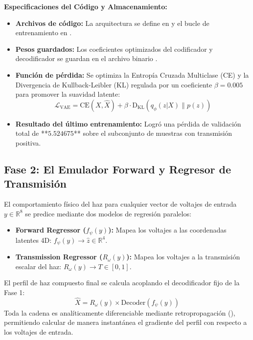 \documentclass[12pt,letterpaper]{article}
\begin{document}
\textbf{Especificaciones del Código y Almacenamiento:}
\begin{itemize}
    \item \textbf{Archivos de código:} La arquitectura se define en  y el bucle de entrenamiento en .
    \item \textbf{Pesos guardados:} Los coeficientes optimizados del codificador y decodificador se guardan en el archivo binario .
    \item \textbf{Función de pérdida:} Se optimiza la Entropía Cruzada Multiclase (CE) y la Divergencia de Kullback-Leibler (KL) regulada por un coeficiente $\beta = 0.005$ para promover la suavidad latente:
    \begin{equation}
        \mathcal{L}_{\text{VAE}} = \text{CE}(X, \hat{X}) + \beta \cdot \text{D}_{\text{KL}}(q_\phi(z|X) \parallel p(z))
    \end{equation}
    \item \textbf{Resultado del último entrenamiento:} Logró una pérdida de validación total de **$5.524675$** sobre el subconjunto de muestras con transmisión positiva.
\end{itemize}

\subsection{Fase 2: El Emulador Forward y Regresor de Transmisión}
El comportamiento físico del haz para cualquier vector de voltajes de entrada $y \in \mathbb{R}^8$ se predice mediante dos modelos de regresión paralelos:
\begin{itemize}
    \item \textbf{Forward Regressor ($f_\psi(y)$):} Mapea los voltajes a las coordenadas latentes 4D: $f_\psi(y) \to \hat{z} \in \mathbb{R}^4$.
    \item \textbf{Transmission Regressor ($R_\omega(y)$):} Mapea los voltajes a la transmisión escalar del haz: $R_\omega(y) \to T \in [0, 1]$.
\end{itemize}
El perfil de haz compuesto final se calcula acoplando el decodificador fijo de la Fase 1:
\begin{equation}
    \hat{X} = R_\omega(y) \times \text{Decoder}(f_\psi(y))
\end{equation}
Toda la cadena es analíticamente diferenciable mediante retropropagación (), permitiendo calcular de manera instantánea el gradiente del perfil con respecto a los voltajes de entrada.
\end{document}

